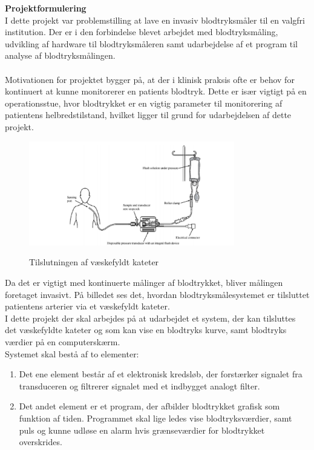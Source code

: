 \textbf{Projektformulering}\\
I dette projekt var problemstilling at lave en invasiv blodtryksmåler til en valgfri institution. Der er i den forbindelse blevet arbejdet med blodtryksmåling, udvikling af hardware til blodtryksmåleren samt udarbejdelse af et program til analyse af blodtryksmålingen.\\ 
\\
Motivationen for projektet bygger på, at der i klinisk praksis ofte er behov for kontinuert at kunne monitorerer en patients blodtryk. Dette er især vigtigt på en operationsstue, hvor blodtrykket er en vigtig parameter til monitorering af patientens helbredstilstand, hvilket ligger til grund for udarbejdelsen af dette projekt.\\
\begin{figure}[H]
	\centering
	\includegraphics[width=0.8\textwidth]{Figurer/Indledning/Opstilling}
	\label{Opstilling}
	\caption{Tilslutningen af væskefyldt kateter}
\end{figure}
Da det er vigtigt med kontinuerte målinger af blodtrykket, bliver målingen foretaget invasivt. På billedet ses det, hvordan blodtryksmålesystemet er tilsluttet patientens arterier via et væskefyldt kateter.\\ 
I dette projekt der skal arbejdes på at udarbejdet et system, der kan tilsluttes det væskefyldte kateter og som kan vise en blodtryks kurve, samt blodtryks værdier på en computerskærm. \\
Systemet skal bestå af to elementer:
\begin{enumerate}
	\item Det ene element består af et elektronisk kredsløb, der forstærker signalet fra transduceren og filtrerer signalet med et indbygget analogt filter.
	\item Det andet element er et program, der afbilder blodtrykket grafisk som funktion af tiden. Programmet skal lige ledes vise blodtryksværdier, samt puls og kunne udløse en alarm hvis grænseværdier for blodtrykket overskrides. 
\end{enumerate}
